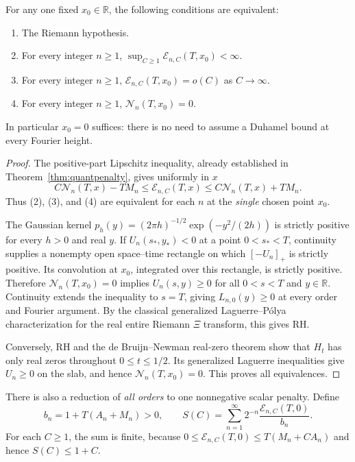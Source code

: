 \begin{theorem}
\label{thm:onepointcriterion}
For any one fixed $x_0\in\mathbb R$, the
following conditions are equivalent:
\begin{enumerate}
\item The Riemann hypothesis.
\item For every integer $n\ge1$,
$\sup_{C\ge1}\mathcal E_{n,C}(T,x_0)<\infty$.
\item For every integer $n\ge1$,
$\mathcal E_{n,C}(T,x_0)=o(C)$
as $C\to\infty$.
\item For every integer $n\ge1$,
$\mathcal N_n(T,x_0)=0$.
\end{enumerate}
In particular $x_0=0$ suffices:
there is no need to assume a Duhamel bound at
every Fourier height.
\end{theorem}
\begin{proof}
The positive-part Lipschitz inequality,
already established in
Theorem~\ref{thm:quantpenalty}, gives
uniformly in $x$
\begin{equation}
C\mathcal N_n(T,x)-TM_n
\le\mathcal E_{n,C}(T,x)
\le C\mathcal N_n(T,x)+TM_n.
\label{eq:onepointsandwich}
\end{equation}
Thus (2), (3), and (4) are equivalent
for each $n$ at the \emph{single} chosen
point $x_0$.

The Gaussian kernel
$p_h(y)=(2\pi h)^{-1/2}\exp(-y^2/(2h))$
is strictly positive for every $h>0$
and real $y$.  If
$U_n(s_*,y_*)<0$ at a point
$0<s_*<T$, continuity supplies
a nonempty open space--time rectangle on
which $[-U_n]_+$ is strictly positive.
Its convolution at $x_0$, integrated over
this rectangle, is strictly positive.
Therefore $\mathcal N_n(T,x_0)=0$
implies $U_n(s,y)\ge0$ for all
$0<s<T$ and $y\in\mathbb R$.
Continuity extends the inequality to
$s=T$, giving
$L_{n,0}(y)\ge0$ at every order and
Fourier argument.  By the classical
generalized Laguerre--P\'olya
characterization for the real entire
Riemann $\Xi$ transform, this gives RH.

Conversely, RH and the
de Bruijn--Newman real-zero theorem
show that $H_t$ has only real zeros
throughout $0\le t\le1/2$.
Its generalized Laguerre inequalities
give $U_n\ge0$ on the slab, and hence
$\mathcal N_n(T,x_0)=0$.  This
proves all equivalences.
\end{proof}

There is also a reduction of
\emph{all orders} to one
nonnegative scalar penalty. Define
\[
b_n=1+T(A_n+M_n)>0,\qquad
S(C)=\sum_{n=1}^{\infty}
2^{-n}\frac{\mathcal E_{n,C}(T,0)}{b_n}.
\]
For each $C\ge1$, the sum is finite,
because $0\le\mathcal E_{n,C}(T,0)
\le T(M_n+CA_n)$ and hence
$S(C)\le 1+C$.

